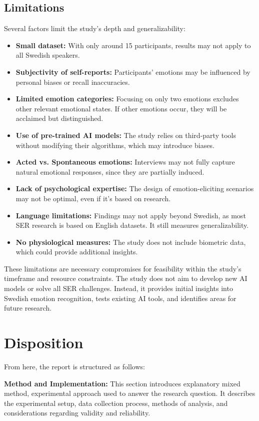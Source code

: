 \subsection{Limitations}
Several factors limit the study’s depth and generalizability: 
\begin{itemize}
    \item \textbf{Small dataset:} With only around 15 participants, results may not apply to all Swedish speakers. 
    \item \textbf{Subjectivity of self-reports:} Participants’ emotions may be influenced by personal biases or recall inaccuracies. 
    \item \textbf{Limited emotion categories:} Focusing on only two emotions excludes other relevant emotional states. If other emotions occur, they will be acclaimed but distinguished. 
    \item \textbf{Use of pre-trained AI models:} The study relies on third-party tools without modifying their algorithms, which may introduce biases. 
    \item \textbf{Acted vs. Spontaneous emotions:} Interviews may not fully capture natural emotional responses, since they are partially induced. 
    \item \textbf{Lack of psychological expertise:} The design of emotion-eliciting scenarios may not be optimal, even if it's based on research. 
    \item \textbf{Language limitations:} Findings may not apply beyond Swedish, as most SER research is based on English datasets. It still measures generalizability. 
    \item \textbf{No physiological measures:} The study does not include biometric data, which could provide additional insights.  
\end{itemize}
These limitations are necessary compromises for feasibility within the study’s timeframe and resource constraints. The study does not aim to develop new AI models or solve all SER challenges. Instead, it provides initial insights into Swedish emotion recognition, tests existing AI tools, and identifies areas for future research. 

\section{Disposition}
From here, the report is structured as follows: 

\textbf{Method and Implementation:} This section introduces explanatory mixed method, experimental approach used to answer the research question. It describes the experimental setup, data collection process, methods of analysis, and considerations regarding validity and reliability.   


